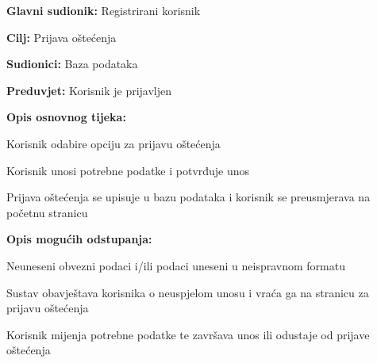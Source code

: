 \noindent {}
\begin{packed_item}

	\item \textbf{Glavni sudionik: }Registrirani korisnik
	\item  \textbf{Cilj:} Prijava oštećenja
	\item  \textbf{Sudionici:} Baza podataka
	\item  \textbf{Preduvjet:} Korisnik je prijavljen
	\item  \textbf{Opis osnovnog tijeka:}

	\item[] \begin{packed_enum}

		\item Korisnik odabire opciju za prijavu oštećenja
		\item Korisnik unosi potrebne podatke i potvrđuje unos
		\item Prijava oštećenja se upisuje u bazu podataka i korisnik se preusmjerava na početnu stranicu
	\end{packed_enum}

	\item  \textbf{Opis mogućih odstupanja:}

	\item[] \begin{packed_item}

		\item[2.a] Neuneseni obvezni podaci i/ili podaci uneseni u neispravnom formatu 
		\item[] \begin{packed_enum}

			\item Sustav obavještava korisnika o neuspjelom unosu i vraća ga na stranicu za prijavu oštećenja
			\item Korisnik mijenja potrebne podatke te završava unos ili odustaje od prijave oštećenja

		\end{packed_enum}
	\end{packed_item}
\end{packed_item}


